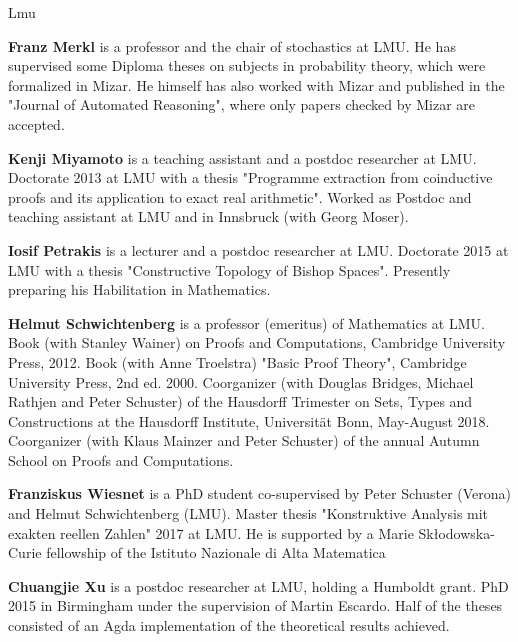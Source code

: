 \begin{sitedescription}{Lmu}
\begin{compactitem}
\item \textbf{Franz Merkl} is a professor and the chair of stochastics
  at LMU.  He has supervised some Diploma theses on subjects in
  probability theory, which were formalized in Mizar.  He himself has
  also worked with Mizar and published in the "Journal of Automated
  Reasoning", where only papers checked by Mizar are accepted.

\item \textbf{Kenji Miyamoto} is a teaching assistant and a postdoc
  researcher at LMU.  Doctorate 2013 at LMU with a thesis "Programme
  extraction from coinductive proofs and its application to exact real
  arithmetic".  Worked as Postdoc and teaching assistant at LMU and in
  Innsbruck (with Georg Moser).

\item \textbf{Iosif Petrakis} is a lecturer and a postdoc researcher
  at LMU.  Doctorate 2015 at LMU with a thesis "Constructive Topology
  of Bishop Spaces".  Presently preparing his Habilitation in
  Mathematics.

\item \textbf{Helmut Schwichtenberg} is a professor (emeritus) of
  Mathematics at LMU.  Book (with Stanley Wainer) on Proofs and
  Computations, Cambridge University Press, 2012.  Book (with Anne
  Troelstra) "Basic Proof Theory", Cambridge University Press, 2nd
  ed. 2000.  Coorganizer (with Douglas Bridges, Michael Rathjen and
  Peter Schuster) of the Hausdorff Trimester on Sets, Types and
  Constructions at the Hausdorff Institute, Universit\"at Bonn,
  May-August 2018.  Coorganizer (with Klaus Mainzer and Peter
  Schuster) of the annual Autumn School on Proofs and Computations.

\item \textbf{Franziskus Wiesnet} is a PhD student co-supervised by
  Peter Schuster (Verona) and Helmut Schwichtenberg (LMU).  Master
  thesis "Konstruktive Analysis mit exakten reellen Zahlen" 2017 at
  LMU.  He is supported by a Marie Sk{\l}odowska-Curie fellowship of
  the Istituto Nazionale di Alta Matematica

\item \textbf{Chuangjie Xu} is a postdoc researcher at LMU, holding a
  Humboldt grant.  PhD 2015 in Birmingham under the supervision of
  Martin Escardo.  Half of the theses consisted of an Agda
  implementation of the theoretical results achieved.

\end{compactitem}



\end{sitedescription}

